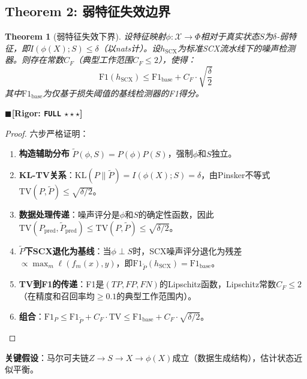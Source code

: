 \documentclass[12pt,a4paper]{ctexart}
\newtheorem{theorem}{Theorem}[section]
\theoremstyle{definition}
\theoremstyle{remark}
\newcommand{\rigorFull}{$\blacksquare$\;\textbf{[Rigor: \texttt{FULL} $\star\star\star$]}}
\begin{document}
\subsection{Theorem 2: 弱特征失效边界}

\begin{theorem}[弱特征失效下界]
\label{thm:2}
设特征映射$\phi: \mathcal{X} \to \Phi$相对于真实状态$S$为$\delta$-弱特征，即$I(\phi(X); S) \leq \delta$（以nats计）。设$h_{\text{SCX}}$为标准SCX流水线下的噪声检测器。则存在常数$C_F$（典型工作范围$C_F \leq 2$），使得：
\begin{equation}
\boxed{\mathrm{F1}(h_{\text{SCX}}) \leq \mathrm{F1}_{\text{base}} + C_F \cdot \sqrt{\frac{\delta}{2}}}
\end{equation}
其中$\mathrm{F1}_{\text{base}}$为仅基于损失阈值的基线检测器的F1得分。
\end{theorem}
\rigorFull

\begin{proof}
六步严格证明：
\begin{enumerate}[label=\arabic*.]
\item \textbf{构造辅助分布} $\tilde{P}(\phi, S) = P(\phi)P(S)$，强制$\phi$和$S$独立。
\item \textbf{KL-TV关系}：$\mathrm{KL}(P \parallel \tilde{P}) = I(\phi(X); S) = \delta$，由Pinsker不等式$\mathrm{TV}(P, \tilde{P}) \leq \sqrt{\delta/2}$。
\item \textbf{数据处理传递}：噪声评分是$\phi$和$S$的确定性函数，因此$\mathrm{TV}(P_{\text{pred}}, \tilde{P}_{\text{pred}}) \leq \mathrm{TV}(P, \tilde{P}) \leq \sqrt{\delta/2}$。
\item \textbf{$\tilde{P}$下SCX退化为基线}：当$\phi \perp S$时，SCX噪声评分退化为残差$\propto \max_m \ell(f_m(x), y)$，即$\mathrm{F1}_{\tilde{P}}(h_{\text{SCX}}) = \mathrm{F1}_{\text{base}}$。
\item \textbf{TV到F1的传递}：F1是$(TP, FP, FN)$的Lipschitz函数，Lipschitz常数$C_F \leq 2$（在精度和召回率均$\geq 0.1$的典型工作范围内）。
\item \textbf{组合}：$\mathrm{F1}_P \leq \mathrm{F1}_{\tilde{P}} + C_F \cdot \mathrm{TV} \leq \mathrm{F1}_{\text{base}} + C_F \cdot \sqrt{\delta/2}$。
\end{enumerate}
\end{proof}

\noindent\textbf{关键假设}：马尔可夫链$Z \to S \to X \to \phi(X)$成立（数据生成结构），估计状态近似平衡。
\end{document}
